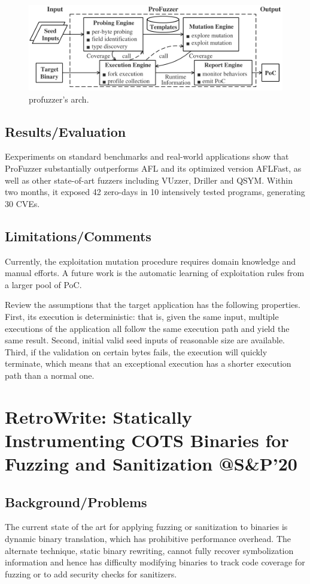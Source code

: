 \begin{figure}[h]
    \centering
    \includegraphics[width=\linewidth]{profuzzer.png} %
    \caption{profuzzer's arch.}	
    \label{fig:profuzzer}
\end{figure}
\subsection{Results/Evaluation}
Eexperiments on standard benchmarks and real-world applications show that ProFuzzer substantially outperforms AFL and its optimized version AFLFast, as well as other state-of-art fuzzers including VUzzer, Driller and QSYM. Within two months, it exposed 42 zero-days in 10 intensively tested programs, generating 30 CVEs.
\subsection{Limitations/Comments}
Currently, the exploitation mutation procedure requires domain knowledge and manual efforts.  A future work is the automatic learning of exploitation rules from a larger pool of PoC.

Review the assumptions that the target application has the following properties. First, its execution is deterministic: that is, given the same input, multiple executions of the application all follow the same execution path and yield the same result. Second, initial valid seed inputs of reasonable size are available. Third, if the validation on certain bytes fails, the execution will quickly terminate, which means that an exceptional execution has a shorter execution path than a normal one. 
\newpage
\section{RetroWrite: Statically Instrumenting COTS Binaries for Fuzzing and Sanitization @S\&P'20}
\subsection{Background/Problems}
The current state of the art for applying fuzzing or sanitization to binaries is dynamic binary translation, which has prohibitive performance overhead. The alternate technique, static binary rewriting, cannot fully recover symbolization information and hence has difficulty modifying binaries to track code coverage for fuzzing or to add security checks for sanitizers.
